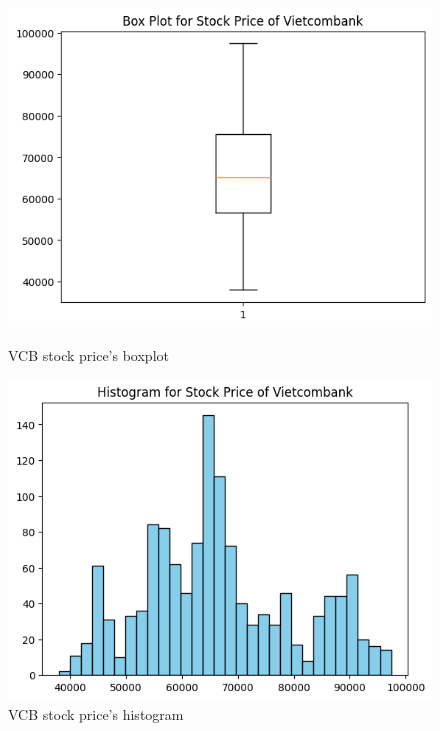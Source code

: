 \begin{figure}[H]
    \centering
    \begin{minipage}{0.23\textwidth}
    \centering
    \includegraphics[width=1\textwidth]{resources/chapter-3/newdata/Boxplot_Vietcombank.png}
    \caption{VCB stock price's boxplot}
    \label{fig:vcb_boxplot}
    \end{minipage}
    \hfill
    \begin{minipage}{0.23\textwidth}
    \centering
    \includegraphics[width=1\textwidth]{resources/chapter-3/newdata/Histogram_Vietcombank.png}
    \caption{VCB stock price's histogram}
    \label{fig:vcb_histogram}
    \end{minipage}
\end{figure}

